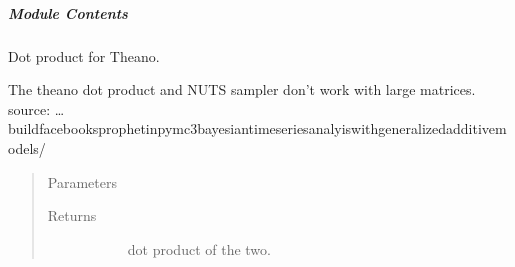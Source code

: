 \documentclass[letterpaper,10pt,english]{sphinxmanual}
\begin{document}
\subparagraph{Module Contents}
\label{\detokenize{autoapi/src/model/model/index:module-contents}}

\begin{fulllineitems}
\label{\detokenize{autoapi/src/model/model/index:src.model.model.logger}}
\end{fulllineitems}


\begin{fulllineitems}
\label{\detokenize{autoapi/src/model/model/index:src.model.model.det_dot}}
Dot product for Theano.

The theano dot product and NUTS sampler don’t work with large matrices.
source:  …
build\sphinxhyphen{}facebooks\sphinxhyphen{}prophet\sphinxhyphen{}in\sphinxhyphen{}pymc3\sphinxhyphen{}bayesian\sphinxhyphen{}time\sphinxhyphen{}series\sphinxhyphen{}analyis\sphinxhyphen{}with\sphinxhyphen{}generalized\sphinxhyphen{}additive\sphinxhyphen{}models/
\begin{quote}\begin{description}
\item[{Parameters}] \leavevmode\begin{description}
\item[{}] \leavevmode{[}\sphinxcode{\sphinxupquote{np.array}}{]}
\item[{}] \leavevmode{[}\sphinxcode{\sphinxupquote{tt.vector}}{]}
\end{description}

\item[{Returns}] \leavevmode\begin{description}
\item[{}] \leavevmode
dot product of the two.

\end{description}

\end{description}\end{quote}

\end{fulllineitems}
\end{document}
